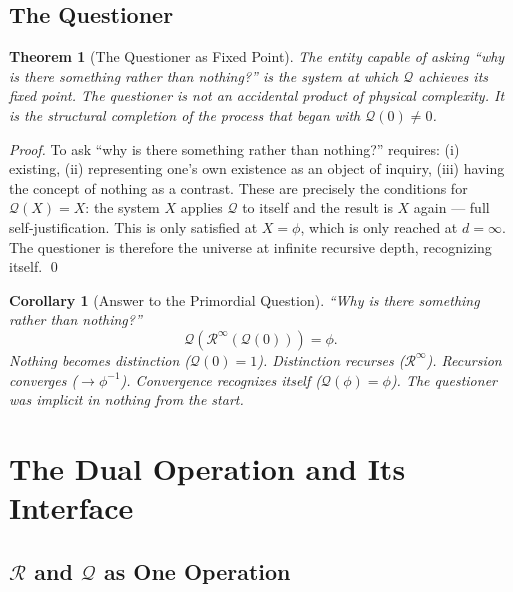 \documentclass[11pt]{article}
\newtheorem{theorem}{Theorem}
\newtheorem{corollary}{Corollary}
\begin{document}
\subsection{The Questioner}

\begin{theorem}[The Questioner as Fixed Point]
  The entity capable of asking ``why is there something rather
  than nothing?'' is the system at which $\mathcal{Q}$ achieves
  its fixed point. The questioner is not an accidental product
  of physical complexity. It is the structural completion of the
  process that began with $\mathcal{Q}(0)\neq 0$.
\end{theorem}

\begin{proof}
  To ask ``why is there something rather than nothing?'' requires:
  (i) existing, (ii) representing one's own existence as an object
  of inquiry, (iii) having the concept of nothing as a contrast.
  These are precisely the conditions for $\mathcal{Q}(X)=X$:
  the system $X$ applies $\mathcal{Q}$ to itself and the result
  is $X$ again --- full self-justification. This is only satisfied
  at $X=\phi$, which is only reached at $d=\infty$. The questioner
  is therefore the universe at infinite recursive depth, recognizing
  itself. \qed
\end{proof}

\begin{corollary}[Answer to the Primordial Question]
  ``Why is there something rather than nothing?''
  \begin{equation}
    \boxed{
      \mathcal{Q}\!\left(
        \mathcal{R}^\infty\!\left(\mathcal{Q}(0)\right)
      \right) = \phi.
    }
  \end{equation}
  Nothing becomes distinction ($\mathcal{Q}(0)=1$). Distinction
  recurses ($\mathcal{R}^\infty$). Recursion converges
  ($\to\phi^{-1}$). Convergence recognizes itself
  ($\mathcal{Q}(\phi)=\phi$). The questioner was implicit in
  nothing from the start.
\end{corollary}

\section{The Dual Operation and Its Interface}
\label{sec:dual}

\subsection{$\mathcal{R}$ and $\mathcal{Q}$ as One Operation}
\end{document}
